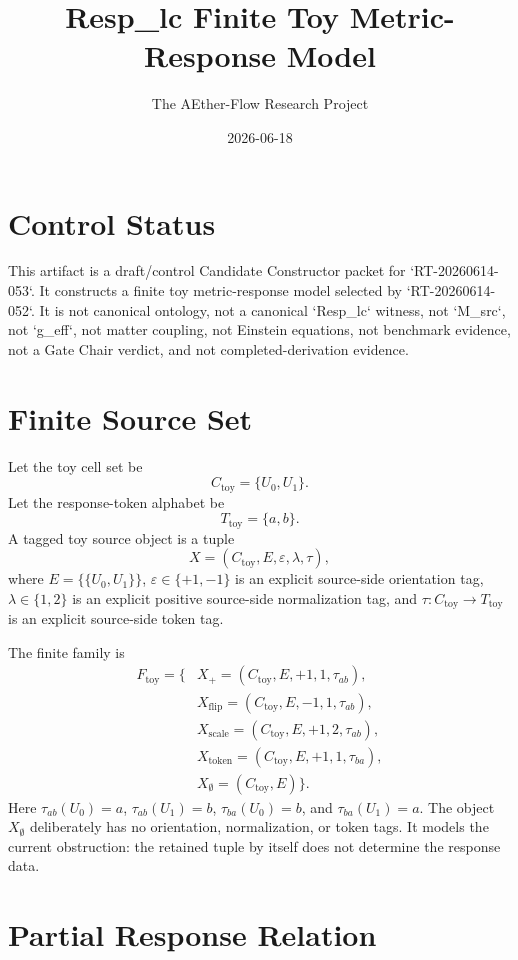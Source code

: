 \documentclass[11pt]{article}
\title{Resp\_lc Finite Toy Metric-Response Model}
\author{The AEther-Flow Research Project}
\date{2026-06-18}
\begin{document}
\maketitle

\section*{Control Status}

This artifact is a draft/control Candidate Constructor packet for
`RT-20260614-053`. It constructs a finite toy metric-response model
selected by `RT-20260614-052`. It is not canonical ontology, not a
canonical `Resp\_lc` witness, not `M\_src`, not `g\_eff`, not matter
coupling, not Einstein equations, not benchmark evidence, not a Gate
Chair verdict, and not completed-derivation evidence.

\section{Finite Source Set}

Let the toy cell set be
\[
  C_{\mathrm{toy}}=\{U_0,U_1\}.
\]
Let the response-token alphabet be
\[
  T_{\mathrm{toy}}=\{a,b\}.
\]
A tagged toy source object is a tuple
\[
  X=(C_{\mathrm{toy}},E,\varepsilon,\lambda,\tau),
\]
where \(E=\{\{U_0,U_1\}\}\), \(\varepsilon\in\{+1,-1\}\) is an
explicit source-side orientation tag, \(\lambda\in\{1,2\}\) is an
explicit positive source-side normalization tag, and
\(\tau:C_{\mathrm{toy}}\rightarrow T_{\mathrm{toy}}\) is an explicit
source-side token tag.

The finite family is
\[
\begin{aligned}
F_{\mathrm{toy}}=\{&
X_+       =(C_{\mathrm{toy}},E,+1,1,\tau_{ab}),\\
&X_{\mathrm{flip}}=(C_{\mathrm{toy}},E,-1,1,\tau_{ab}),\\
&X_{\mathrm{scale}}=(C_{\mathrm{toy}},E,+1,2,\tau_{ab}),\\
&X_{\mathrm{token}}=(C_{\mathrm{toy}},E,+1,1,\tau_{ba}),\\
&X_{\emptyset}=(C_{\mathrm{toy}},E)\}.
\end{aligned}
\]
Here \(\tau_{ab}(U_0)=a\), \(\tau_{ab}(U_1)=b\),
\(\tau_{ba}(U_0)=b\), and \(\tau_{ba}(U_1)=a\). The object
\(X_{\emptyset}\) deliberately has no orientation, normalization, or
token tags. It models the current obstruction: the retained tuple by
itself does not determine the response data.

\section{Partial Response Relation}
\end{document}
